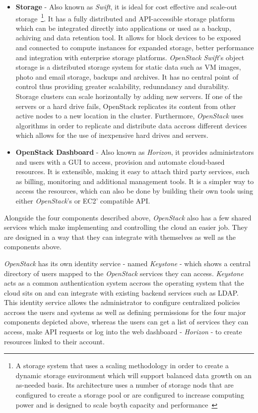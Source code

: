 \begin{itemize}
\item \textbf{Storage} - Also known as \textit{Swift}, it is ideal for cost effective and scale-out storage~\footnote{A storage system that uses a scaling methodology in order to create a dynamic storage environment which will support balanced data growth on an as-needed basis. Its architecture uses a number of storage nods that are configured to create a storage pool or are configured to increase computing power and is designed to scale boyth capacity and performance~\cite{scaleout}}. It has a fully distributed and API-accessible storage platform which can be integrated directly into applications or used as a backup, achiving and data retention tool. It allows for block devices to be exposed and connected to compute instances for expanded storage, better performance and integration with enterprise storage platforms. \textit{OpenStack Swift}'s object storage is a distributed storage system for static data such as VM images, photo and email storage, backups and archives. It has no central point of control thus providing greater scalability, redunndancy and durability. Storage clusters can scale horizontally by adding new servers. If one of the servers or a hard drive fails, OpenStack replicates its content from other active nodes to a new location in the cluster. Furthermore, \textit{OpenStack} uses algorithms in order to replicate and distribute data accross different devices which allows for the use of inexpensive hard drives and servers.
\item \textbf{OpenStack Dashboard} - Also known as \textit{Horizon}, it provides administrators and users with a GUI to access, provision and automate cloud-based resources. It is extensible, making it easy to attach third party services, such as billing, monitoring and additional management tools. It is a simpler way to access the resources, which can also be done by building their own tools using either \textit{OpenStack}'s or EC2' compatible API.
\end{itemize}

Alongside the four components described above, \textit{OpenStack} also has a few shared services which make implementing and controlling the cloud an easier job. They are designed in a way that they can integrate with themselves as well as the components above.

\textit{OpenStack} has its own identity service - named \textit{Keystone} - which shows a central directory of users mapped to the \textit{OpenStack} services they can access. \textit{Keystone} acts as a common authentication system accross the operating system that the cloud sits on and can integrate with existing backend services such as LDAP. This identity service allows the administrator to configure centralized policies accross the users and systems as well as defining permissions for the four major components depicted above, whereas the users can get a list of services they can access, make API requests or log into the web dashboard - \textit{Horizon} - to create resources linked to their account.

